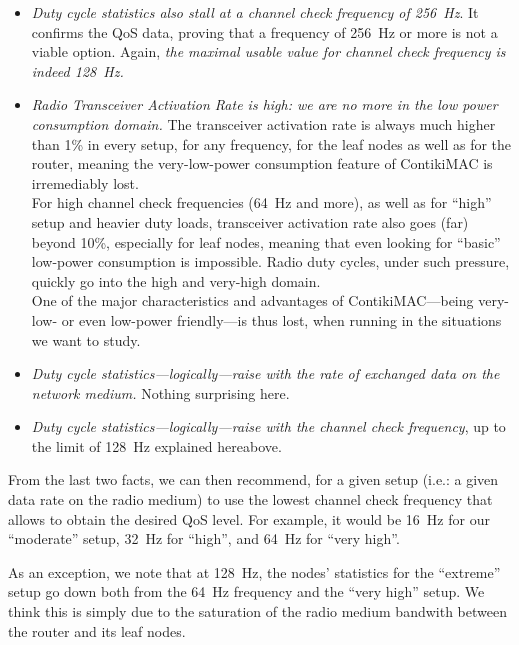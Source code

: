 \documentclass[a4paper,twoside]{article}
\begin{document}
\begin{itemize}

\item \emph{Duty cycle statistics also stall at a channel check frequency
of 256~Hz}. It confirms the QoS data, proving that a frequency of 256~Hz
or more is not a viable option. Again, \emph{the maximal usable value
for channel check frequency is indeed 128~Hz.}

\item \emph{Radio Transceiver Activation Rate is high: we are no more
in the low power consumption domain.} The transceiver activation rate
is always much higher than 1\% in every setup, for any frequency, for
the leaf nodes as well as for the router, meaning the very-low-power
consumption feature of ContikiMAC is irremediably lost.\\
For high channel check frequencies (64~Hz and more), as well as for
``high'' setup and heavier duty loads, transceiver activation rate
also goes (far) beyond 10\%, especially for leaf nodes, meaning that
even looking for ``basic'' low-power consumption is impossible.
Radio duty cycles, under such pressure, quickly go into the high
and very-high domain.\\
One of the major characteristics and advantages of ContikiMAC---being
very-low- or even low-power friendly---is thus lost, when running
in the situations we want to study.

\item \emph{Duty cycle statistics---logically---raise with the rate of
exchanged data on the network medium.} Nothing surprising here.

\item \emph{Duty cycle statistics---logically---raise with the channel check
frequency}, up to the limit of 128~Hz explained hereabove.

\end{itemize}

From the last two facts, we can then recommend, for a given setup
(i.e.: a given data rate on the radio medium) to use the lowest channel
check frequency that allows to obtain the desired QoS level.
For example, it would be 16~Hz for our ``moderate'' setup, 32~Hz for
``high'', and 64~Hz for ``very high''.

As an exception, we note that at 128~Hz, the nodes' statistics for the
``extreme'' setup go down both from the 64~Hz frequency and the ``very high''
setup. We think this is simply due to the saturation of the radio medium
bandwith between the router and its leaf nodes.
\end{document}
